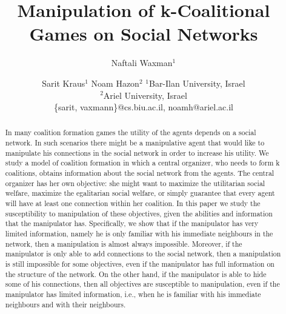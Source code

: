 \documentclass{article}
\title{Manipulation of k-Coalitional Games on Social Networks }
\author{%

    Naftali Waxman$^1$
    \and
    Sarit Kraus$^1$
    \And
     Noam Hazon$^2$
     \affiliations
    $^1$Bar-Ilan University, Israel\\
    $^2$Ariel University, Israel\\
    \emails
    \{sarit, vaxmann\}@cs.biu.ac.il,
    noamh@ariel.ac.il
}
\begin{document}
\maketitle
\begin{abstract}
In many coalition formation games the utility of the agents depends on a social network. In such scenarios there might be a manipulative agent that would like to manipulate his connections in the social network in order to increase his utility. We study a model of coalition formation in which a central organizer, who needs to form k coalitions, obtains information about the social network from the agents.
The central organizer has her own objective: she might want to maximize the utilitarian social welfare, maximize the egalitarian social welfare, or simply guarantee that every agent will have at least one connection within her coalition. 
In this paper we study the susceptibility to manipulation of these objectives, given the abilities and information that the manipulator has. Specifically, we show that if the manipulator has very limited information, namely he is only familiar with his immediate neighbours in the network, then a manipulation is almost always impossible. Moreover, if the manipulator is only able to add connections to the social network, then a manipulation is still impossible for some objectives, even if the manipulator has full information on the structure of the network. On the other hand,  if the manipulator is able to hide some of his connections, then all objectives are susceptible to manipulation, even if the manipulator has limited information, i.e., when he is familiar with his immediate neighbours and with their neighbours.


\end{abstract}
\end{document}
